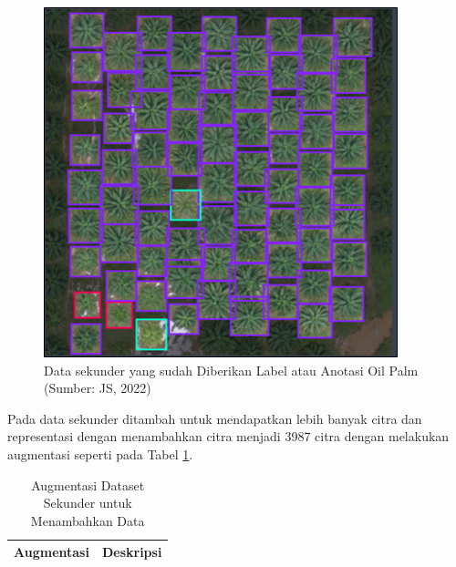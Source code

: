 \begin{enumerate}
	\begin{figure}[H]
		\vspace{-0.1cm}
		\begin{center}
			\includegraphics[width=1\columnwidth]{bab3/Gambar/Picture8.png}
		\end{center}
		\vspace{-0.2cm}
		\captionsetup{justification=centering}
		\caption{Data sekunder yang sudah Diberikan Label atau Anotasi Oil Palm\\(Sumber: JS, 2022)}\label{img:Data-Sekunder-yang-Sudah-Diberikan-Label}
	\end{figure}
	
	Pada data sekunder ditambah untuk mendapatkan lebih banyak citra dan representasi dengan menambahkan citra menjadi 3987 citra dengan melakukan augmentasi seperti pada Tabel \ref{tbl:Augmentasi-Dataset-Sekunder}.
	
	\begin{singlespace}
		\begin{table}[H]
			\centering
			\caption{Augmentasi Dataset Sekunder untuk Menambahkan Data}
			\label{tbl:Augmentasi-Dataset-Sekunder}
			\begin{tabular}{|p{4cm}|p{8cm}|}
				\hline
				Augmentasi & Deskripsi                           \\ \hline
				

\end{tabular}
\end{table}
\end{singlespace}
\end{enumerate}
